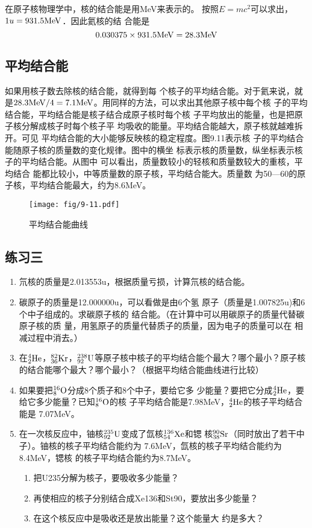 在原子核物理学中，核的结合能是用MeV来表示的。
按照$E=mc^2$可以求出，$1u=931.5{\rm MeV}$．因此氦核的结
合能是
\[0.030375\x 931.5{\rm MeV}=28.3{\rm MeV}\]

\subsection{平均结合能} 

如果用核子数去除核的结合能，就得到每
个核子的平均结合能。对于氦来说，就是$28.3{\rm MeV}/4=
7.1{\rm MeV}$。用同样的方法，可以求出其他原子核中每个核
子的平均结合能，平均结合能是核子结合成原子核时每个核
子平均放出的能量，也是把原子核分解成核子时每个核子平
均吸收的能量。平均结合能越大，原子核就越难拆开。可见
平均结合能的大小能够反映核的稳定程度。图9.11表示核
子的平均结合能随原子核的质量数的变化规律。图中的横坐
标表示核的质量数，纵坐标表示核子的平均结合能。从图中
可以看出，质量数较小的轻核和质量数较大的重核，平均结合
能都比较小，中等质量数的原子核，平均结合能大。质量数
为50—60的原子核，平均结合能最大，约为8.6MeV。

\begin{figure}[htp]
\centering
\texttt{[image: fig/9-11.pdf]}
\caption{平均结合能曲线}
\end{figure}


\subsection*{练习三}

\begin{enumerate}
    \item 氘核的质量是2.013553u，根据质量亏损，计算氘核的结合能。
    \item 碳原子的质量是12.000000u，可以看做是由6个氢
原子（质量是1.007825u)和6个中子组成的。求碳原子核的
结合能。（在计算中可以用碳原子的质量代替碳原子核的质
量，用氢原子的质量代替质子的质量，因为电子的质量可以在
相减过程中消去。）
\item  在$\atom{He}{4}{2}$，$\atom{Kr}{82}{36}$，$\atom{U}{238}{92}$等原子核中核子的平均结合能个最大？哪个最小？原子核的结合能哪个最大？哪个最小？（根据平均结合能曲线进行比较）
\item 如果要把$\atom{O}{16}{8}$分成8个质子和8个中子，要给它多
少能量？要把它分成$\atom{He}{4}{2}$，要给它多少能量？已知$\atom{O}{16}{8}$的核
子平均结合能是7.98MeV，$\atom{He}{4}{2}$的核子平均结合能是
7.07MeV。
\item 在一次核反应中，铀核$\atom{U}{235}{92}$变成了氙核$\atom{Xe}{136}{54}$和锶
核$\atom{Sr}{90}{38}$（同时放出了若干中子）。铀核的核子平均结合能约为
7.6MeV，氙核的核子平均结合能约为8.4MeV，锶核
的核子平均结合能约为8.7MeV。
\begin{enumerate}
    \item 把U235分解为核子，要吸收多少能量？
    \item 再使相应的核子分别结合成Xe136和St90，要放出多少能量？
    \item 在这个核反应中是吸收还是放出能量？这个能量大
约是多大？
\end{enumerate}
\end{enumerate}


